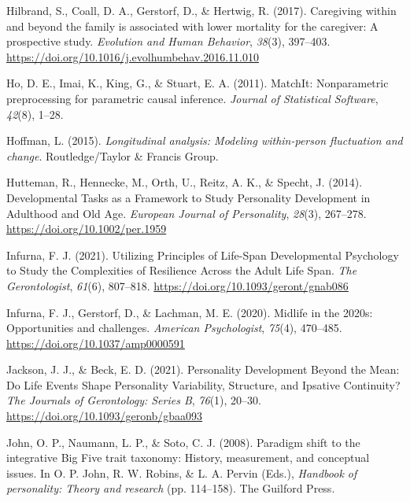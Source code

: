 \documentclass[
  english,
  man, noextraspace,floatsintext]{apa7}
\begin{document}
\leavevmode\hypertarget{ref-hilbrandCaregivingFamilyAssociated2017}{}%
Hilbrand, S., Coall, D. A., Gerstorf, D., \& Hertwig, R. (2017). Caregiving within and beyond the family is associated with lower mortality for the caregiver: A prospective study. \emph{Evolution and Human Behavior}, \emph{38}(3), 397--403. \url{https://doi.org/10.1016/j.evolhumbehav.2016.11.010}

\leavevmode\hypertarget{ref-MatchIt2011}{}%
Ho, D. E., Imai, K., King, G., \& Stuart, E. A. (2011). MatchIt: Nonparametric preprocessing for parametric causal inference. \emph{Journal of Statistical Software}, \emph{42}(8), 1--28.

\leavevmode\hypertarget{ref-hoffmanLongitudinalAnalysisModeling2015}{}%
Hoffman, L. (2015). \emph{Longitudinal analysis: Modeling within-person fluctuation and change}. Routledge/Taylor \& Francis Group.

\leavevmode\hypertarget{ref-huttemanDevelopmentalTasksFramework2014}{}%
Hutteman, R., Hennecke, M., Orth, U., Reitz, A. K., \& Specht, J. (2014). Developmental Tasks as a Framework to Study Personality Development in Adulthood and Old Age. \emph{European Journal of Personality}, \emph{28}(3), 267--278. \url{https://doi.org/10.1002/per.1959}

\leavevmode\hypertarget{ref-infurnaUtilizingPrinciplesLifeSpan2021}{}%
Infurna, F. J. (2021). Utilizing Principles of Life-Span Developmental Psychology to Study the Complexities of Resilience Across the Adult Life Span. \emph{The Gerontologist}, \emph{61}(6), 807--818. \url{https://doi.org/10.1093/geront/gnab086}

\leavevmode\hypertarget{ref-infurnaMidlife2020sOpportunities2020}{}%
Infurna, F. J., Gerstorf, D., \& Lachman, M. E. (2020). Midlife in the 2020s: Opportunities and challenges. \emph{American Psychologist}, \emph{75}(4), 470--485. \url{https://doi.org/10.1037/amp0000591}

\leavevmode\hypertarget{ref-jacksonPersonalityDevelopmentMean2021}{}%
Jackson, J. J., \& Beck, E. D. (2021). Personality Development Beyond the Mean: Do Life Events Shape Personality Variability, Structure, and Ipsative Continuity? \emph{The Journals of Gerontology: Series B}, \emph{76}(1), 20--30. \url{https://doi.org/10.1093/geronb/gbaa093}

\leavevmode\hypertarget{ref-johnParadigmShiftIntegrative2008}{}%
John, O. P., Naumann, L. P., \& Soto, C. J. (2008). Paradigm shift to the integrative Big Five trait taxonomy: History, measurement, and conceptual issues. In O. P. John, R. W. Robins, \& L. A. Pervin (Eds.), \emph{Handbook of personality: Theory and research} (pp. 114--158). The Guilford Press.
\end{document}

